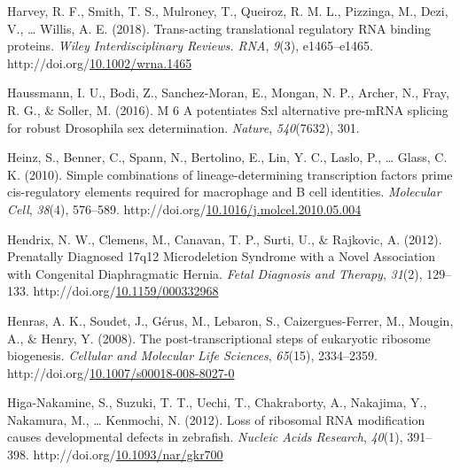 \documentclass[12pt,oneside]{reedthesis}
\newlength{\cslhangindent}
\newenvironment{CSLReferences}[2] %
 {%
  \setlength{\parindent}{0pt}
  \ifodd #1 \everypar{\setlength{\hangindent}{\cslhangindent}}\ignorespaces\fi
  \ifnum #2 > 0
  \setlength{\parskip}{#2\baselineskip}
  \fi
 }%
 {}
\begin{document}
\begin{CSLReferences}{1}{0}
\leavevmode{}%
Harvey, R. F., Smith, T. S., Mulroney, T., Queiroz, R. M. L., Pizzinga, M., Dezi, V., \ldots{} Willis, A. E. (2018). Trans-acting translational regulatory {RNA} binding proteins. \emph{Wiley Interdisciplinary Reviews. RNA}, \emph{9}(3), e1465--e1465. http://doi.org/\href{https://doi.org/10.1002/wrna.1465}{10.1002/wrna.1465}

\leavevmode{}%
Haussmann, I. U., Bodi, Z., Sanchez-Moran, E., Mongan, N. P., Archer, N., Fray, R. G., \& Soller, M. (2016). M 6 {A} potentiates {Sxl} alternative pre-{mRNA} splicing for robust {Drosophila} sex determination. \emph{Nature}, \emph{540}(7632), 301.

\leavevmode{}%
Heinz, S., Benner, C., Spann, N., Bertolino, E., Lin, Y. C., Laslo, P., \ldots{} Glass, C. K. (2010). Simple combinations of lineage-determining transcription factors prime cis-regulatory elements required for macrophage and {B} cell identities. \emph{Molecular Cell}, \emph{38}(4), 576--589. http://doi.org/\href{https://doi.org/10.1016/j.molcel.2010.05.004}{10.1016/j.molcel.2010.05.004}

\leavevmode{}%
Hendrix, N. W., Clemens, M., Canavan, T. P., Surti, U., \& Rajkovic, A. (2012). Prenatally {Diagnosed} 17q12 {Microdeletion Syndrome} with a {Novel Association} with {Congenital Diaphragmatic Hernia}. \emph{Fetal Diagnosis and Therapy}, \emph{31}(2), 129--133. http://doi.org/\href{https://doi.org/10.1159/000332968}{10.1159/000332968}

\leavevmode{}%
Henras, A. K., Soudet, J., Gérus, M., Lebaron, S., Caizergues-Ferrer, M., Mougin, A., \& Henry, Y. (2008). The post-transcriptional steps of eukaryotic ribosome biogenesis. \emph{Cellular and Molecular Life Sciences}, \emph{65}(15), 2334--2359. http://doi.org/\href{https://doi.org/10.1007/s00018-008-8027-0}{10.1007/s00018-008-8027-0}

\leavevmode{}%
Higa-Nakamine, S., Suzuki, T. T., Uechi, T., Chakraborty, A., Nakajima, Y., Nakamura, M., \ldots{} Kenmochi, N. (2012). Loss of ribosomal {RNA} modification causes developmental defects in zebrafish. \emph{Nucleic Acids Research}, \emph{40}(1), 391--398. http://doi.org/\href{https://doi.org/10.1093/nar/gkr700}{10.1093/nar/gkr700}


\end{CSLReferences}
\end{document}
